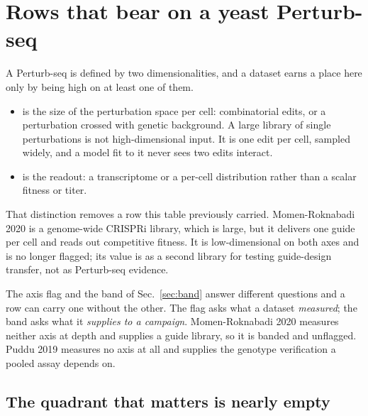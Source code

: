 
\section{Rows that bear on a yeast Perturb-seq}\label{sec:perturbseq}

A Perturb-seq is defined by two dimensionalities, and a dataset earns a place here only by
being high on at least one of them.

\begin{itemize}[leftmargin=1.2em,itemsep=1pt,topsep=2pt]
  \item {} is the size of the perturbation space per cell:
    combinatorial edits, or a perturbation crossed with genetic background. A large library
    of single perturbations is not high-dimensional input. It is one edit per cell, sampled
    widely, and a model fit to it never sees two edits interact.
  \item {} is the readout: a transcriptome or a per-cell
    distribution rather than a scalar fitness or titer.
\end{itemize}

That distinction removes a row this table previously carried. Momen-Roknabadi 2020 is a
genome-wide CRISPRi library, which is large, but it delivers one guide per cell and reads
out competitive fitness. It is low-dimensional on both axes and is no longer flagged; its
value is as a second library for testing guide-design transfer, not as Perturb-seq evidence.

The axis flag and the  band of Sec.~\ref{sec:band} answer different
questions and a row can carry one without the other. The flag asks what a dataset
\emph{measured}; the band asks what it \emph{supplies to a campaign}. Momen-Roknabadi 2020
measures neither axis at depth and supplies a guide library, so it is banded and unflagged.
Puddu 2019 measures no axis at all and supplies the genotype verification a pooled assay
depends on.



\subsection{The quadrant that matters is nearly empty}\label{sec:quadrant}


